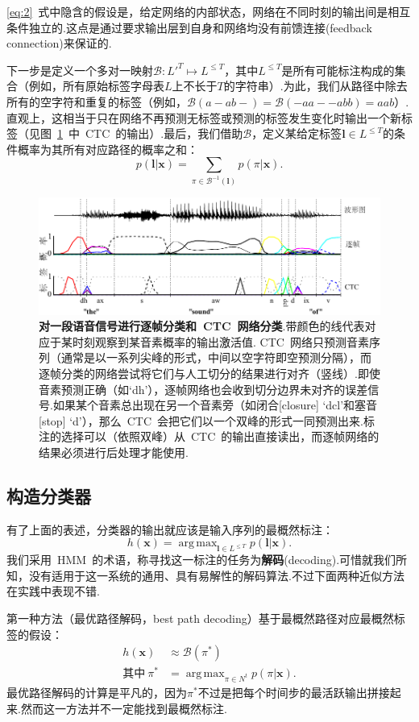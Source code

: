 \documentclass{ctexart}
\DeclareMathOperator*{\argmax}{arg\,max}
\def\cB{\mathcal{B}}
\def\vl{\mathbf{l}}
\def\vx{\mathbf{x}}
\begin{document}
\eqref{eq:2}~式中隐含的假设是，给定网络的内部状态，网络在不同时刻的输出间是相互条件独立的.这点是通过要求输出层到自身和网络均没有前馈连接(feedback connection)来保证的.

下一步是定义一个多对一映射$\cB: L'^T\mapsto L^{\le T}$，其中$L^{\le T}$是所有可能标注构成的集合（例如，所有原始标签字母表$L$上不长于$T$的字符串）.为此，我们从路径中除去所有的空字符和重复的标签（例如，$\cB(a-ab-)=\cB(-aa--abb)=aab$）.直观上，这相当于只在网络不再预测无标签或预测的标签发生变化时输出一个新标签（见图~\ref{fig:1}~中~CTC~的输出）.最后，我们借助$\cB$，定义某给定标签$\vl\in L^{\le T}$的条件概率为其所有对应路径的概率之和：
\begin{equation}
	\label{eq:3}
	p(\vl|\vx) = \sum_{\pi\in\cB^{-1}(\vl)}p(\pi|\vx).
\end{equation}
\begin{figure}
	\label{fig:1}
	\centering
	\includegraphics[width=\textwidth]{fig/1}
	\caption{\textbf{对一段语音信号进行逐帧分类和~CTC~网络分类}.带颜色的线代表对应于某时刻观察到某音素概率的输出激活值. CTC~网络只预测音素序列（通常是以一系列尖峰的形式，中间以空字符即空预测分隔），而逐帧分类的网络尝试将它们与人工切分的结果进行对齐（竖线）.即使音素预测正确（如`dh'），逐帧网络也会收到切分边界未对齐的误差信号.如果某个音素总出现在另一个音素旁（如闭合[closure] `dcl'和塞音[stop] `d'），那么~CTC~会把它们以一个双峰的形式一同预测出来.标注的选择可以（依照双峰）从~CTC~的输出直接读出，而逐帧网络的结果必须进行后处理才能使用.}
\end{figure}
\subsection{构造分类器}
\label{sec:classifier}
有了上面的表述，分类器的输出就应该是输入序列的最概然标注：
\[h(\vx) = \argmax_{\vl\in L^{\le T}} p(\vl|\vx).\]
我们采用~HMM~的术语，称寻找这一标注的任务为\textbf{解码}(decoding).可惜就我们所知，没有适用于这一系统的通用、具有易解性的解码算法.不过下面两种近似方法在实践中表现不错.

第一种方法（最优路径解码，best path decoding）基于最概然路径对应最概然标签的假设：
\begin{equation}
	\begin{split}
		h(\vx) & \approx \cB(\pi^*)\\
		\text{其中}~\pi^* & = \argmax_{\pi\in N^t}p(\pi|\vx).
	\end{split}
\end{equation}
最优路径解码的计算是平凡的，因为$\pi^*$不过是把每个时间步的最活跃输出拼接起来.然而这一方法并不一定能找到最概然标注.
\end{document}

